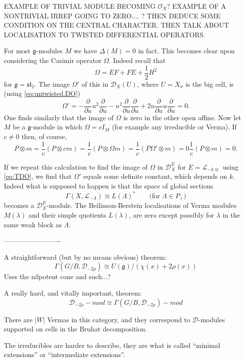 \documentclass[12pt]{article}
\theoremstyle{plain}
\theoremstyle{definition}
\numberwithin{equation}{section}
\newcommand{\la}{\lambda}
\newcommand{\La}{\Lambda}
\newcommand{\Om}{\Omega}
\newcommand{\D}{\Delta}
\newcommand{\g}{\mathfrak{g}}
\newcommand{\sll}{\mathfrak{sl}}
\newcommand{\CD}{\mathcal{D}}
\newcommand{\CL}{\mathcal{L}}
\newcommand{\OO}{\mathcal{O}}
\begin{document}
EXAMPLE OF TRIVIAL MODULE BECOMING $\OO_X$? EXAMPLE OF A NONTRIVIAL IRREP GOING TO ZERO.... ? THEN DEDUCE SOME CONDITION ON THE CENTRAL CHARACTER. THEN TALK ABOUT LOCALISATION TO TWISTED DIFFERENTIAL OPERATORS.






For most $\g$-modules $M$ we have $\D(M) = 0$ in fact. This becomes clear upon considering the Casimir operator $\Om$. Indeed recall that
\[
\Om = EF + FE + \frac{1}{2}H^2
\]
for $\g = \sll_2$. The image $\Om'$ of this in $\CD_X(U)$, where $U = X_\sigma$ is the big cell, is (using \eqref{eq:untwisted.DO})
\[
\Om' = -\frac{\partial}{\partial u} u^2 \frac{\partial}{\partial u} - u^2 \frac{\partial}{\partial u} \frac{\partial}{\partial u} + 2 u \frac{\partial}{\partial u} u \frac{\partial}{\partial u} = 0.
\]
One finds similarly that the image of $\Om$ is zero in the other open affine. Now let $M$ be a $\g$-module in which $\Om = c I_M$ (for example any irreducible or Verma). If $c \neq 0$ then, of course,
\[
P \otimes m = \frac{1}{c} (P \otimes c m) = \frac{1}{c} (P \otimes \Om m) = \frac{1}{c} (P \Om' \otimes m) = 0 \frac{1}{c} (P \otimes m) = 0.
\]

If we repeat this calculation to find the image of $\Om$ in $\CD_X^E$ for $E = \CL_{-k\varpi}$ using \eqref{eq:TDO}, we find that $\Om'$ equals some definite constant, which depends on $k$. Indeed what is supposed to happen is that the space of global sections
\[
\Gamma(X, \CL_{-\La}) \cong L(\La)^* \qquad \text{(for $\La \in P_+$)}
\]
becomes a $\CD_X^{E}$-module. The Beilinson-Berstein localisations of Verma modules $M(\la)$ and their simple quotients $L(\la)$, are zero except possibly for $\la$ in the same weak block as $\La$.



-------------------------


A straightforward (but by no means obvious) theorem:
\[
\Gamma(G/B, \CD_{-2\rho}) \cong U(\g) / (\chi(x) + 2\rho(x))
\]
Uses the nilpotent cone and such...?

A really hard, and vitally important, theorem:
\[
\CD_{-2\rho}-mod \cong \Gamma(G/B, \CD_{-2\rho})-mod
\]

There are $|W|$ Vermas in this category, and they correspond to $\CD$-modules supported on cells in the Bruhat decomposition.

The irreducibles are harder to describe, they are what is called ``minimal extensions'' or ``intermediate extensions''.
\end{document}
